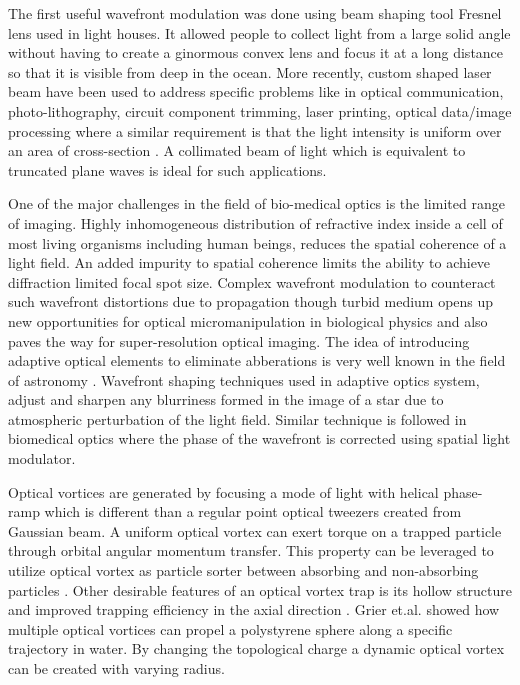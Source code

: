 The first useful wavefront modulation was done using beam shaping tool Fresnel lens used in light houses. It allowed people to collect light from a large solid angle without having to create a ginormous convex lens and focus it at a long distance so that it is visible from deep in the ocean. More recently, custom shaped laser beam have been used to address specific problems like in optical communication, photo-lithography, circuit component trimming, laser printing, optical data/image processing where a similar requirement is that the light intensity is uniform over an area of cross-section \cite{Dickey03}. A collimated beam of light which is equivalent to truncated plane waves is ideal for such applications. 

One of the major challenges in the field of bio-medical optics is the limited range of imaging. Highly inhomogeneous distribution of refractive index inside a cell of most living organisms including human beings, reduces the spatial coherence of a light field. An added impurity to spatial coherence limits the ability to achieve diffraction limited focal spot size. Complex wavefront modulation to counteract such wavefront distortions due to propagation though turbid medium opens up new opportunities for optical micromanipulation in biological physics and also paves the way for super-resolution optical imaging. The idea of introducing adaptive optical elements to eliminate abberations is very well known in the field of astronomy \cite{Beuzit1997, beuzit1994}. Wavefront shaping techniques used in adaptive optics system, adjust and sharpen any blurriness formed in the image of a star due to atmospheric perturbation of the light field. Similar technique is followed in biomedical optics where the phase of the wavefront is corrected using spatial light modulator.

Optical vortices are generated by focusing a mode of light with helical phase-ramp which is different than a regular point optical tweezers created from Gaussian beam. A uniform optical vortex can exert torque on a trapped particle through orbital angular momentum transfer. This property can be leveraged to utilize optical vortex as particle sorter between absorbing and non-absorbing particles \cite{ONEIL2000139, Parkin:06, chavez2003}. Other desirable features of an optical vortex trap is its hollow structure and improved trapping efficiency in the axial direction \cite{NIEMINEN2008195}. Grier et.al. \cite{Curtis:03}  showed how multiple optical vortices can propel a polystyrene sphere along a specific trajectory in water. By changing the topological charge a dynamic optical vortex can be created with varying radius. 

